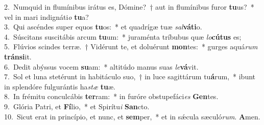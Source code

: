 {2.~}Numquid in flumínibus irátus es, Dómine?~† aut in flumínibus furor \textbf{tu}us?~* vel in mari indignáti\textit{o} \textbf{tu}a?\\
{3.~}Qui ascéndes super equos \textbf{tu}os:~* et quadrígæ tuæ \textit{sal}\textbf{vá}\textbf{ti}o.\\
{4.~}Súscitans suscitábis arcum \textbf{tu}um:~* juraménta tríbubus quæ \textit{lo}\textbf{cú}\textbf{tus} es;\\
{5.~}Flúvios scindes terræ.~† Vidérunt te, et doluérunt \textbf{mon}tes:~* gurges aquá\textit{rum} \textbf{trán}\textbf{si}it.\\
{6.~}Dedit abýssus vocem \textbf{su}am:~* altitúdo manus suas \textit{le}\textbf{vá}vit.\\
{7.~}Sol et luna stetérunt in habitáculo suo,~† in luce sagittárum tu\textbf{á}rum,~* ibunt in splendóre fulgurántis ha\textit{stæ} \textbf{tu}æ.\\
{8.~}In frémitu conculcábis \textbf{ter}ram:~* in furóre obstupefáci\textit{es} \textbf{Gen}tes.\\
{9.~}Glória Patri, et \textbf{Fí}lio,~* et Spirítu\textit{i} \textbf{San}cto.\\
{10.~}Sicut erat in princípio, et nunc, et \textbf{sem}per,~* et in sǽcula sæculó\textit{rum}. \textbf{A}men.\\
